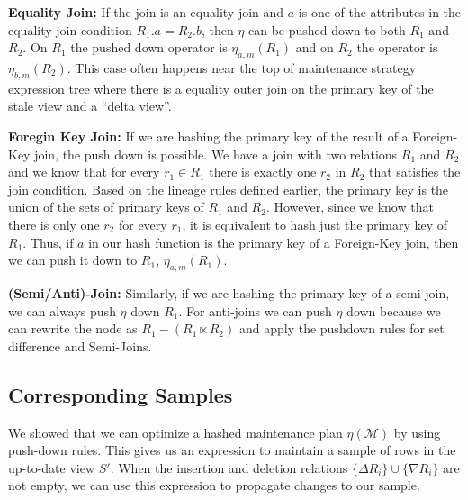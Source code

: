\vspace{.25em}

{\noindent \textbf{Equality Join:}} If the join is an equality join and $a$ is one of the attributes in the equality join condition $R_1.a = R_2.b$, then $\eta$ can be pushed down to both $R_1$ and $R_2$. On $R_1$ the pushed down operator is $\eta_{a, m}(R_1)$ and on $R_2$ the operator is $\eta_{b, m}(R_2)$. This case often happens near the top of maintenance strategy expression tree where there is a equality outer join on the primary key of the stale view and a ``delta view''.

\vspace{.25em}

{\noindent \textbf{Foregin Key Join:}} If we are hashing the primary key of the result of a Foreign-Key join, the push down is possible. We have a join with two relations $R_1$ and $R_2$ and we know that for every $r_1 \in R_1$ there is exactly one $r_2$ in $R_2$ that satisfies the join condition. Based on the lineage rules defined earlier, the primary key is the union of the sets of primary keys of $R_1$ and $R_2$. However, since we know that there is only one $r_2$ for every $r_1$, it is equivalent to hash just the primary key of $R_1$. Thus, if $a$ in our hash function is the primary key of a Foreign-Key join, then we can push it down to $R_1$, $\eta_{a, m}(R_1)$. 

\vspace{.25em}

{\noindent \textbf{(Semi/Anti)-Join:}} Similarly, if we are hashing the primary key of a semi-join, we can always push $\eta$ down $R_1$. For anti-joins we can push $\eta$ down because we can rewrite the node as $R_1 - (R_1 \ltimes R_2) $ and apply the pushdown rules for set difference and Semi-Joins.

\subsection{Corresponding Samples}
We showed that we can optimize a hashed maintenance plan $\eta(\mathcal{M})$ by using push-down rules.
This gives us an expression to maintain a sample of rows in the up-to-date view $S'$.
When the insertion and deletion relations $\{\Delta R_i\} \cup \{\nabla R_i\}$ are not empty, we can use
this expression to propagate changes to our sample.

